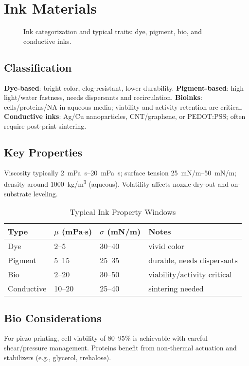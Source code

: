 \documentclass[conference]{IEEEtran}
\begin{document}
\section{Ink Materials}

\begin{figure}[!t]
  \centering
  
  \caption{Ink categorization and typical traits: dye, pigment, bio, and conductive inks.}
  \label{fig:ink_classes}
\end{figure}

\subsection{Classification}
\textbf{Dye-based}: bright color, clog-resistant, lower durability. 
\textbf{Pigment-based}: high light/water fastness, needs dispersants and recirculation. 
\textbf{Bioinks}: cells/proteins/NA in aqueous media; viability and activity retention are critical. 
\textbf{Conductive inks}: Ag/Cu nanoparticles, CNT/graphene, or PEDOT:PSS; often require post-print sintering.

\subsection{Key Properties}
Viscosity typically \SIrange{2}{20}{mPa.s}; surface tension \SIrange{25}{50}{mN/m}; density around \SI{1000}{kg/m^3} (aqueous). Volatility affects nozzle dry-out and on-substrate leveling.

\begin{table}[!t]
\caption{Typical Ink Property Windows}
\label{tab:inks}
\centering
\begin{tabular}{@{}llll@{}}
\toprule
Type & $\mu$ (mPa$\cdot$s) & $\sigma$ (mN/m) & Notes \\
\midrule
Dye    & 2--5  & 30--40 & vivid color \\
Pigment& 5--15 & 25--35 & durable, needs dispersants \\
Bio    & 2--20 & 30--50 & viability/activity critical \\
Conductive & 10--20 & 25--40 & sintering needed \\
\bottomrule
\end{tabular}
\end{table}

\subsection{Bio Considerations}
For piezo printing, cell viability of 80--95\% is achievable with careful shear/pressure management. Proteins benefit from non-thermal actuation and stabilizers (e.g., glycerol, trehalose).
\end{document}
